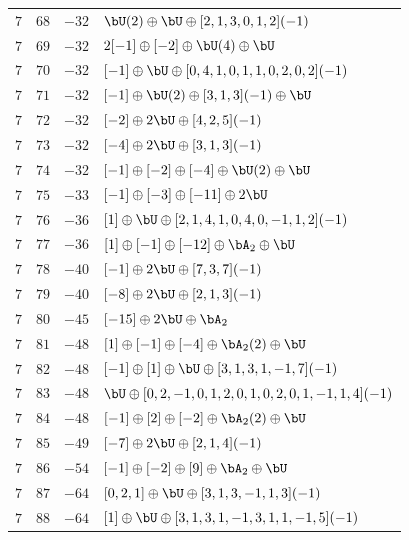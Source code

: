 \begin{center}
\begin{longtable}{llll}
 \(7\) & \(68\) & \(-32\) & \(\bU(2) \oplus \bU \oplus [2, 1, 3, 0, 1, 2](-1)\) \\
 \(7\) & \(69\) & \(-32\) & \(2 [-1] \oplus [-2] \oplus \bU(4) \oplus \bU\) \\
 \(7\) & \(70\) & \(-32\) & \([-1] \oplus \bU \oplus [0, 4, 1, 0, 1, 1, 0, 2, 0, 2](-1)\) \\
 \(7\) & \(71\) & \(-32\) & \([-1] \oplus \bU(2) \oplus [3, 1, 3](-1) \oplus \bU\) \\
 \(7\) & \(72\) & \(-32\) & \([-2] \oplus 2 \bU \oplus [4, 2, 5](-1)\) \\
 \(7\) & \(73\) & \(-32\) & \([-4] \oplus 2 \bU \oplus [3, 1, 3](-1)\) \\
 \(7\) & \(74\) & \(-32\) & \([-1] \oplus [-2] \oplus [-4] \oplus \bU(2) \oplus \bU\) \\
 \(7\) & \(75\) & \(-33\) & \([-1] \oplus [-3] \oplus [-11] \oplus 2 \bU\) \\
 \(7\) & \(76\) & \(-36\) & \([1] \oplus \bU \oplus [2, 1, 4, 1, 0, 4, 0, -1, 1, 2](-1)\) \\
 \(7\) & \(77\) & \(-36\) & \([1] \oplus [-1] \oplus [-12] \oplus \bA_{2} \oplus \bU\) \\
 \(7\) & \(78\) & \(-40\) & \([-1] \oplus 2 \bU \oplus [7, 3, 7](-1)\) \\
 \(7\) & \(79\) & \(-40\) & \([-8] \oplus 2 \bU \oplus [2, 1, 3](-1)\) \\
 \(7\) & \(80\) & \(-45\) & \([-15] \oplus 2 \bU \oplus \bA_{2}\) \\
 \(7\) & \(81\) & \(-48\) & \([1] \oplus [-1] \oplus [-4] \oplus \bA_{2}(2) \oplus \bU\) \\
 \(7\) & \(82\) & \(-48\) & \([-1] \oplus [1] \oplus \bU \oplus [3, 1, 3, 1, -1, 7](-1)\) \\
 \(7\) & \(83\) & \(-48\) & \(\bU \oplus [0, 2, -1, 0, 1, 2, 0, 1, 0, 2, 0, 1, -1, 1, 4](-1)\) \\
 \(7\) & \(84\) & \(-48\) & \([-1] \oplus [2] \oplus [-2] \oplus \bA_{2}(2) \oplus \bU\) \\
 \(7\) & \(85\) & \(-49\) & \([-7] \oplus 2 \bU \oplus [2, 1, 4](-1)\) \\
 \(7\) & \(86\) & \(-54\) & \([-1] \oplus [-2] \oplus [9] \oplus \bA_{2} \oplus \bU\) \\
 \(7\) & \(87\) & \(-64\) & \([0, 2, 1] \oplus \bU \oplus [3, 1, 3, -1, 1, 3](-1)\) \\
 \(7\) & \(88\) & \(-64\) & \([1] \oplus \bU \oplus [3, 1, 3, 1, -1, 3, 1, 1, -1, 5](-1)\) \\

\end{longtable}
\end{center}
